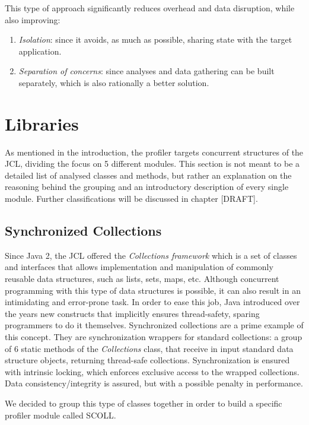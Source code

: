 \documentclass[]{usiinfthesis}
\begin{document}
This type of approach significantly reduces overhead and data disruption, while also improving:
\begin{enumerate}
    \item \textit{Isolation}: since it avoids, as much as possible, sharing state with the target application. 
    \item \textit{Separation of concerns}: since analyses and data gathering can be built separately, which is also rationally a better solution.
\end{enumerate}

\section{Libraries}
As mentioned in the introduction, the profiler targets concurrent structures of the JCL, dividing the focus on 5 different modules. This section is not meant to be a detailed list of analysed classes and methods, but rather an explanation on the reasoning behind the grouping and an introductory description of every single module. Further classifications will be discussed in chapter [DRAFT].

\subsection{Synchronized Collections}
Since Java 2, the JCL offered the \textit{Collections framework} which is a set of classes and interfaces that allows implementation and manipulation of commonly reusable data structures, such as lists, sets, maps, etc. Although concurrent programming with this type of data structures is possible, it can also result in an intimidating and error-prone task. In order to ease this job, Java introduced over the years new constructs that implicitly ensures thread-safety, sparing programmers to do it themselves. Synchronized collections are a prime example of this concept. They are synchronization wrappers for standard collections: a group of 6 static methods of the \textit{Collections} class, that receive in input standard data structure objects, returning thread-safe collections. Synchronization is ensured with intrinsic locking, which enforces exclusive access to the wrapped collections. Data consistency/integrity is assured, but with a possible penalty in performance.

\noindent
We decided to group this type of classes together in order to build a specific profiler module called SCOLL.
\end{document}
